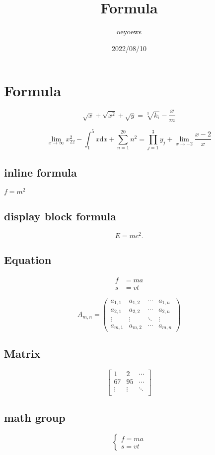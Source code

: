 \documentclass{article}
\title{Formula}
\author{oeyoews}
\date{2022/08/10}
\begin{document}
\maketitle

\section{Formula}%
\label{sec:Forum}

\[
	\sqrt{x} + \sqrt{x^2} +\sqrt{y} = \sqrt[3]{k_i} - \frac{x}{m}
\]

$$  \lim_{x \to \infty} x^2_{22} - \int_{1}^{5}x\mathrm{d}x + \sum_{n=1}^{20} n^{2} = \prod_{j=1}^{3} y_{j}  + \lim_{x \to -2} \frac{x-2}{x} $$

\subsection{inline formula}%
\label{sub:inline forum}

$f = m^2$

\subsection{display block formula}%
\label{sub:display block forum}

\[
	E = mc^2
	.\]

\subsection{Equation}%
\label{sec:equation}

\begin{align}
	f & = ma \\
	s & = vt
\end{align}

\begin{equation}
	A_{m,n} =
	\begin{pmatrix}
		a_{1,1} & a_{1,2} & \cdots & a_{1,n} \\
		a_{2,1} & a_{2,2} & \cdots & a_{2,n} \\
		\vdots  & \vdots  & \ddots & \vdots  \\
		a_{m,1} & a_{m,2} & \cdots & a_{m,n}
	\end{pmatrix}
\end{equation}

\subsection{Matrix}%
\label{sec:matrix}

$$\begin{bmatrix}
		1      & 2      & \cdots \\
		67     & 95     & \cdots \\
		\vdots & \vdots & \ddots \\
	\end{bmatrix}$$

\subsection{math group}%
\label{sec:math}

\begin{equation}
	\left\{
	\begin{aligned}
		f = ma \\
		s = vt
	\end{aligned}
\right.
\end{equation}
\end{document}
